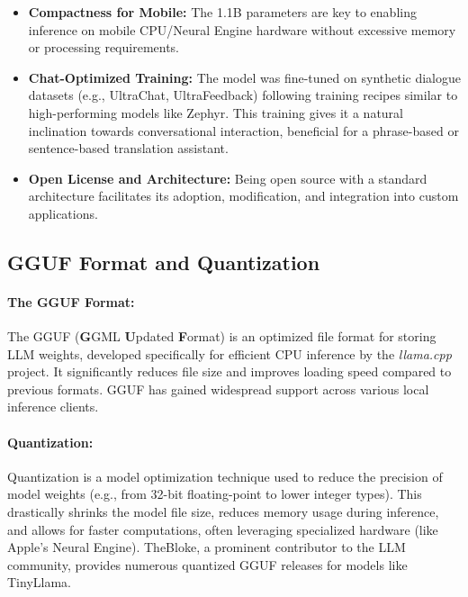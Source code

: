 \documentclass[12pt]{article}
\begin{document}
\begin{itemize}
    \item \textbf{Compactness for Mobile:} The 1.1B parameters are key to enabling inference on mobile CPU/Neural Engine hardware without excessive memory or processing requirements.
    \item \textbf{Chat-Optimized Training:} The model was fine-tuned on synthetic dialogue datasets (e.g., UltraChat, UltraFeedback) following training recipes similar to high-performing models like Zephyr. This training gives it a natural inclination towards conversational interaction, beneficial for a phrase-based or sentence-based translation assistant.
    \item \textbf{Open License and Architecture:} Being open source with a standard architecture facilitates its adoption, modification, and integration into custom applications.
\end{itemize}

\subsection{GGUF Format and Quantization}

\paragraph{The GGUF Format:}
The GGUF (\textbf{G}GML \textbf{U}pdated \textbf{F}ormat) is an optimized file format for storing LLM weights, developed specifically for efficient CPU inference by the \emph{llama.cpp} project. It significantly reduces file size and improves loading speed compared to previous formats. GGUF has gained widespread support across various local inference clients.

\paragraph{Quantization:} %
Quantization is a model optimization technique used to reduce the precision of model weights (e.g., from 32-bit floating-point to lower integer types). This drastically shrinks the model file size, reduces memory usage during inference, and allows for faster computations, often leveraging specialized hardware (like Apple's Neural Engine). TheBloke, a prominent contributor to the LLM community, provides numerous quantized GGUF releases for models like TinyLlama.
\end{document}
